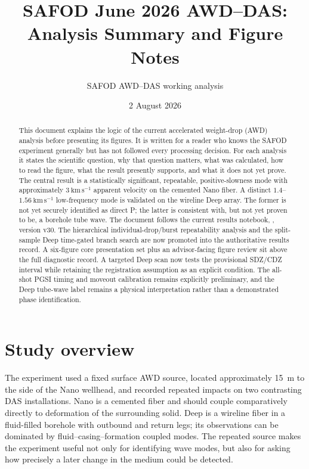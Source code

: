 \documentclass[11pt]{article}
\title{SAFOD June 2026 AWD--DAS: Analysis Summary and Figure Notes}
\author{SAFOD AWD--DAS working analysis}
\date{2 August 2026}
\begin{document}
\maketitle

\begin{abstract}
This document explains the logic of the current accelerated weight-drop (AWD)
analysis before presenting its figures.  It is written for a reader who knows
the SAFOD experiment generally but has not followed every processing decision.
For each analysis it states the scientific question, why that question matters,
what was calculated, how to read the figure, what the result presently supports,
and what it does not yet prove.  The central result is a statistically
significant, repeatable, positive-slowness mode with approximately
$3~\mathrm{km\,s^{-1}}$ apparent velocity on the cemented Nano fiber.  A distinct
$1.4$--$1.56~\mathrm{km\,s^{-1}}$ low-frequency mode is validated on the
wireline Deep array.  The former is not yet securely identified as direct P;
the latter is consistent with, but not yet proven to be, a borehole tube wave.
The document follows the current results notebook,
, version v30.  The hierarchical
individual-drop/burst repeatability analysis and the split-sample Deep
time-gated branch search are now promoted into the authoritative results
record.  A six-figure core presentation set plus an advisor-facing figure
review sit above the full diagnostic record.  A targeted Deep scan now tests
the provisional SDZ/CDZ interval while retaining the registration assumption
as an explicit condition.  The all-shot PGSI timing and moveout calibration
remains explicitly preliminary, and the Deep tube-wave label remains a
physical interpretation rather than a demonstrated phase identification.
\end{abstract}

\tableofcontents
\clearpage

\section{Study overview}

The experiment used a fixed surface AWD source, located approximately 15~m to
the side of the Nano wellhead, and recorded repeated impacts on two contrasting
DAS installations.  Nano is a cemented fiber and should couple comparatively
directly to deformation of the surrounding solid.  Deep is a wireline fiber in
a fluid-filled borehole with outbound and return legs; its observations can be
dominated by fluid--casing--formation coupled modes.  The repeated source makes
the experiment useful not only for identifying wave modes, but also for asking
how precisely a later change in the medium could be detected.
\end{document}
